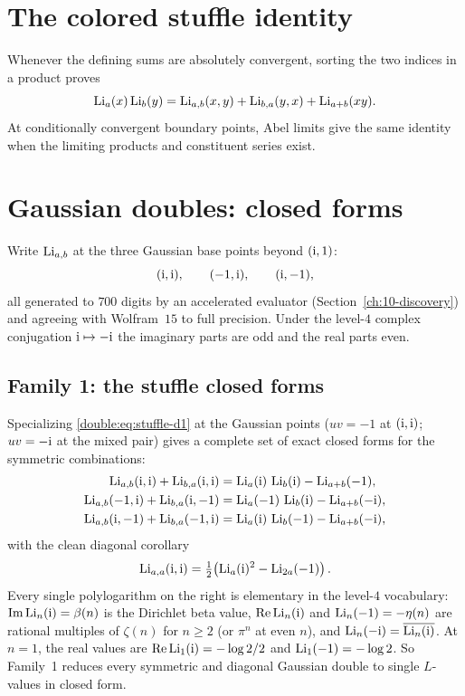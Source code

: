 

\section{The colored stuffle identity}
Whenever the defining sums are absolutely convergent, sorting the two
indices in a product proves
\begin{equation}\label{double:eq:stuffle-d1}
\operatorname{Li}_a(x)\operatorname{Li}_b(y)=\operatorname{Li}_{a,b}(x,y)+\operatorname{Li}_{b,a}(y,x)+\operatorname{Li}_{a+b}(xy).
\end{equation}
At conditionally convergent boundary points, Abel limits give the same
identity when the limiting products and constituent series exist.

\section{Gaussian doubles: closed forms}\label{double:sec:gauss-fam}

Write $\operatorname{Li}_{a,b}$ at the three Gaussian base points beyond $(\mathrm{i},1)$:
\[
  (\mathrm{i},\mathrm{i}),\qquad (-1,\mathrm{i}),\qquad (\mathrm{i},-1),
\]
all generated to $700$ digits by an accelerated evaluator (Section~\ref{ch:10-discovery}) and agreeing
with Wolfram~$15$ to full precision. Under the level-$4$ complex conjugation $\mathrm{i}\mapsto-\mathrm{i}$ the
imaginary parts are odd and the real parts even.

\subsection{Family 1: the stuffle closed forms}

Specializing \eqref{double:eq:stuffle-d1} at the Gaussian points ($uv=-1$ at $(\mathrm{i},\mathrm{i})$; $uv=-\mathrm{i}$ at the
mixed pair) gives a complete set of exact closed forms for the symmetric combinations:
\begin{align}
  \operatorname{Li}_{a,b}(\mathrm{i},\mathrm{i})+\operatorname{Li}_{b,a}(\mathrm{i},\mathrm{i})   &= \operatorname{Li}_a(\mathrm{i})\,\operatorname{Li}_b(\mathrm{i})   -\operatorname{Li}_{a+b}(-1),\label{double:eq:g-sym-ii}\\
  \operatorname{Li}_{a,b}(-1,\mathrm{i})+\operatorname{Li}_{b,a}(\mathrm{i},-1)     &= \operatorname{Li}_a(-1)\,\operatorname{Li}_b(\mathrm{i})    -\operatorname{Li}_{a+b}(-\mathrm{i}),\label{double:eq:g-sym-mix}\\
  \operatorname{Li}_{a,b}(\mathrm{i},-1)+\operatorname{Li}_{b,a}(-1,\mathrm{i})     &= \operatorname{Li}_a(\mathrm{i})\,\operatorname{Li}_b(-1)    -\operatorname{Li}_{a+b}(-\mathrm{i}),\nonumber
\end{align}
with the clean diagonal corollary
\begin{equation}\label{double:eq:g-diag}
  \operatorname{Li}_{a,a}(\mathrm{i},\mathrm{i})=\tfrac12\!\left(\operatorname{Li}_a(\mathrm{i})^2-\operatorname{Li}_{2a}(-1)\right).
\end{equation}
Every single polylogarithm on the right is elementary in the level-$4$ vocabulary:
$\operatorname{Im}\operatorname{Li}_n(\mathrm{i})=\beta(n)$ is the Dirichlet beta value, $\operatorname{Re}\operatorname{Li}_n(\mathrm{i})$ and $\operatorname{Li}_n(-1)=-\eta(n)$
are rational multiples of $\zeta(n)$ for $n\ge2$ (or $\pi^n$ at even $n$),
and $\operatorname{Li}_n(-\mathrm{i})=\overline{\operatorname{Li}_n(\mathrm{i})}$. At $n=1$, the real values
are $\operatorname{Re}\operatorname{Li}_1(\mathrm{i})=-\log2/2$ and $\operatorname{Li}_1(-1)=-\log2$.
So Family~1 reduces every symmetric and diagonal Gaussian double to single $L$-values in closed form.

